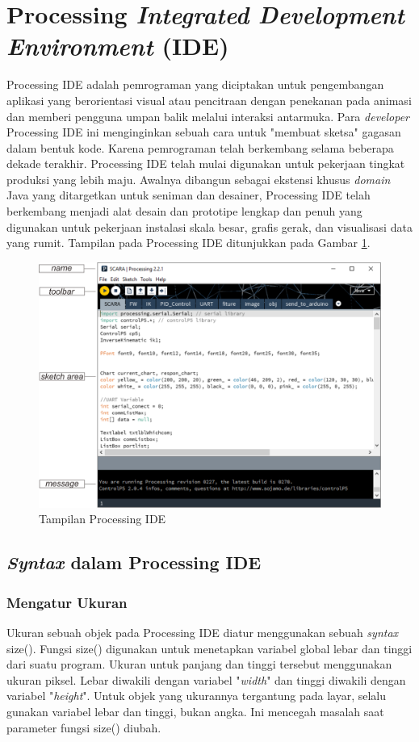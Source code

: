 \section{Processing \textit{Integrated Development Environment} (IDE)}
Processing IDE adalah pemrograman yang diciptakan untuk pengembangan aplikasi yang berorientasi visual atau pencitraan dengan penekanan pada animasi dan memberi pengguna umpan balik melalui interaksi antarmuka. Para \textit{developer} Processing IDE ini menginginkan sebuah cara untuk "membuat sketsa" gagasan dalam bentuk kode. Karena pemrograman telah berkembang selama beberapa dekade terakhir. Processing IDE telah mulai digunakan untuk pekerjaan tingkat produksi yang lebih maju. Awalnya dibangun sebagai ekstensi khusus \textit{domain} Java yang ditargetkan untuk seniman dan desainer, Processing IDE telah berkembang menjadi alat desain dan prototipe lengkap dan penuh yang digunakan untuk pekerjaan instalasi skala besar, grafis gerak, dan visualisasi data yang rumit\cite{aku2012}. Tampilan pada Processing IDE ditunjukkan pada Gambar \ref{pic.processingide}.
\begin{figure}[H]
	\centering
	\includegraphics[width=12cm]{gambar/processing_view.png}
	\caption{Tampilan Processing IDE}
	\label{pic.processingide}
\end{figure}


\subsection{\textit{Syntax} dalam Processing IDE }

\subsubsection{Mengatur Ukuran}
Ukuran sebuah objek pada Processing IDE diatur menggunakan sebuah \textit{syntax} size(). Fungsi size() digunakan untuk menetapkan variabel global lebar dan tinggi dari suatu program. Ukuran untuk panjang dan tinggi tersebut menggunakan ukuran piksel. Lebar diwakili dengan variabel "\textit{width}" dan tinggi diwakili dengan variabel "\textit{height}". Untuk objek yang ukurannya tergantung pada layar, selalu gunakan variabel lebar dan tinggi, bukan angka. Ini mencegah masalah saat parameter fungsi size() diubah.


